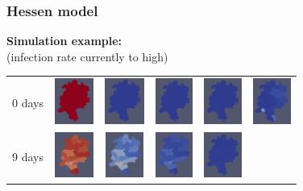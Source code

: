 \documentclass{beamer}
\begin{document}
\begin{frame}
\frametitle{Hessen model} 
	\textbf{Simulation example:}\\(infection rate currently to high)\\
	\hspace{3cm}
	\centering
	\begin{tabular}{c c c c c c }
		0 days
		& \includegraphics[height=1.5cm]{./images/0_0S.png}
		& \includegraphics[height=1.5cm]{./images/0_1E.png}
		& \includegraphics[height=1.5cm]{./images/0_2I.png}
		& \includegraphics[height=1.5cm]{./images/0_3R.png}
		& \includegraphics[height=1.5cm]{./images/0_4D.png}\\
		9 days
		& \includegraphics[height=1.5cm]{./images/12_0S.png}
		& \includegraphics[height=1.5cm]{./images/12_1E.png}
		& \includegraphics[height=1.5cm]{./images/12_2I.png}
		& \includegraphics[height=1.5cm]{./images/12_3R.png}

\end{tabular}
\end{frame}
\end{document}
